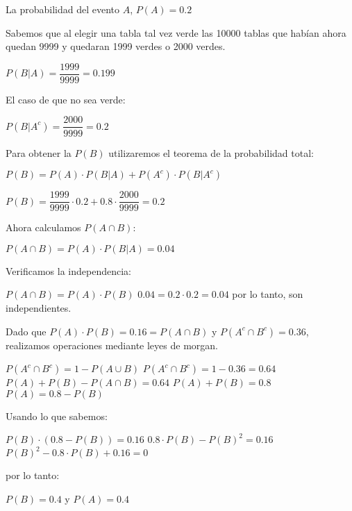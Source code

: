 \documentclass{report}
\begin{document}
La probabilidad del evento $A$, $P(A) = 0.2$ \newline 

Sabemos que al elegir una tabla tal vez verde las 10000 tablas que habían ahora quedan 9999 y quedaran 1999 verdes o 2000 verdes.

$P(B | A) = \dfrac{1999}{9999} = 0.199$

El caso de que no sea verde:

$P(B | A^c) = \dfrac{2000}{9999} = 0.2$

Para obtener la $P(B)$ utilizaremos el teorema de la probabilidad total:

$P(B) = P(A) \cdot P(B | A) + P(A^c) \cdot P(B | A^c)$

$P(B) = \dfrac{1999}{9999} \cdot 0.2 + 0.8 \cdot \dfrac{2000}{9999} = 0.2$

Ahora calculamos $P(A \cap B)$:

$P(A \cap B) = P(A) \cdot P(B | A) = 0.04$

Verificamos la independencia:

$P(A \cap B) = P(A) \cdot P(B)$
$0.04 = 0.2 \cdot 0.2 = 0.04$ por lo tanto, son independientes.



Dado que $P(A) \cdot P(B) = 0.16 = P(A \cap B)$ y $P(A^c \cap B^c) = 0.36$, realizamos operaciones mediante leyes de morgan.

$P(A^c \cap B^c) = 1 - P(A \cup B)$ \newline
$P(A^c \cap B^c) = 1 - 0.36 = 0.64$ \newline
$P(A) + P(B) - P(A \cap B) = 0.64$ \newline 
$P(A) + P(B) = 0.8$
$P(A) = 0.8 - P(B)$

Usando lo que sabemos:

$P(B) \cdot (0.8 - P(B)) = 0.16$
$0.8 \cdot P(B) - P(B)^2 = 0.16$
$P(B)^2 - 0.8\cdot P(B) + 0.16 = 0$

por lo tanto:

$P(B) = 0.4$ y $P(A) = 0.4$

\end{document}
